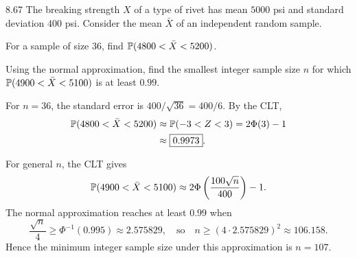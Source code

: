 \documentclass[11pt,oneside]{article}
\begin{document}
\begin{exercise}{8.67}
The breaking strength $X$ of a type of rivet has mean $5000$ psi and standard deviation $400$ psi. Consider the mean $\bar X$ of an independent random sample.
\begin{exercisesubparts}
\item For a sample of size $36$, find $\mathbb{P}(4800<\bar X<5200)$.
\item Using the normal approximation, find the smallest integer sample size $n$ for which $\mathbb{P}(4900<\bar X<5100)$ is at least $0.99$.
\end{exercisesubparts}
\end{exercise}
\begin{solution}
\begin{exercisesubparts}
\item For $n=36$, the standard error is $400/\sqrt{36}=400/6$. By the CLT,
\[
\begin{aligned}
\mathbb{P}(4800<\bar X<5200)
&\approx\mathbb{P}(-3<Z<3)
=2\Phi(3)-1\\
&\approx\boxed{0.9973}.
\end{aligned}
\]
\item For general $n$, the CLT gives
\[
\mathbb{P}(4900<\bar X<5100)
\approx2\Phi\left(\frac{100\sqrt n}{400}\right)-1.
\]
The normal approximation reaches at least $0.99$ when
\[
\frac{\sqrt n}{4}\ge\Phi^{-1}(0.995)\approx2.575829,
\quad\text{so}\quad
n\ge(4\cdot2.575829)^2\approx106.158.
\]
Hence the minimum integer sample size under this approximation is $\boxed{n=107}$.
\end{exercisesubparts}
\end{solution}
\end{document}
